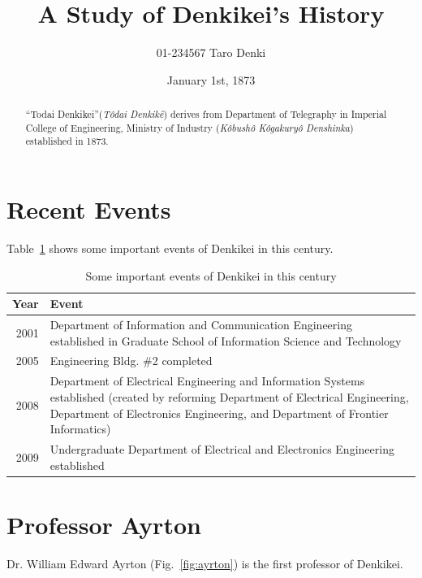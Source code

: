 \documentclass[a4paper]{article}
\begin{document}
\title{A Study of Denkikei's History}
\date{January 1st, 1873}
\author{01-234567 Taro Denki}

\dendentitle

\begin{abstract}
  ``Todai Denkikei''(\textit{T\^odai Denkik\^e}) derives from Department of Telegraphy in Imperial College of Engineering, Ministry of Industry (\textit{K\^obush\^o K\^ogakury\^o Denshinka}) established in 1873.
\end{abstract}

\section{Recent Events}

Table~\ref{tab:events} shows some important events of Denkikei in this century.

\begin{table}[htbp]
  \centering
  \caption{Some important events of Denkikei in this century}
  \label{tab:events}
  \begin{tabularx}{\linewidth}{r|X}
    Year & Event \\ \hline
    2001 & Department of Information and Communication Engineering established in Graduate School of Information Science and Technology\\
    2005 & Engineering Bldg. \#2 completed\\
    2008 & Department of Electrical Engineering and Information Systems established (created by reforming Department of Electrical Engineering, Department of Electronics Engineering, and Department of Frontier Informatics)\\
    2009 & Undergraduate Department of Electrical and Electronics Engineering established \\
  \end{tabularx}
\end{table}

\section{Professor Ayrton}

Dr. William Edward Ayrton (Fig.~\ref{fig:ayrton}) is the first professor of Denkikei.
\end{document}
